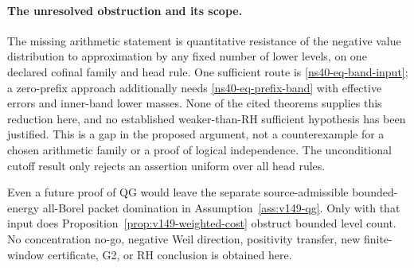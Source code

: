 \paragraph{The unresolved obstruction and its scope.}
The missing arithmetic statement is quantitative resistance of the
negative value distribution to approximation by any fixed number
of lower levels, on one declared cofinal family and head rule.
One sufficient route is \eqref{ns40-eq-band-input}; a zero-prefix
approach additionally needs \eqref{ns40-eq-prefix-band} with effective
errors and inner-band lower masses. None of the cited theorems supplies
this reduction here, and no established weaker-than-RH sufficient
hypothesis has been justified. This is a gap in the proposed argument,
not a counterexample for a chosen arithmetic family or a proof of
logical independence. The unconditional cutoff result only rejects
an assertion uniform over all head rules.

Even a future proof of QG would leave the separate source-admissible
bounded-energy all-Borel packet domination in
Assumption~\ref{ass:v149-qg}. Only with that input does
Proposition~\ref{prop:v149-weighted-cost} obstruct bounded level count.
No concentration no-go, negative Weil direction, positivity transfer,
new finite-window certificate, G2, or RH conclusion is obtained here.

